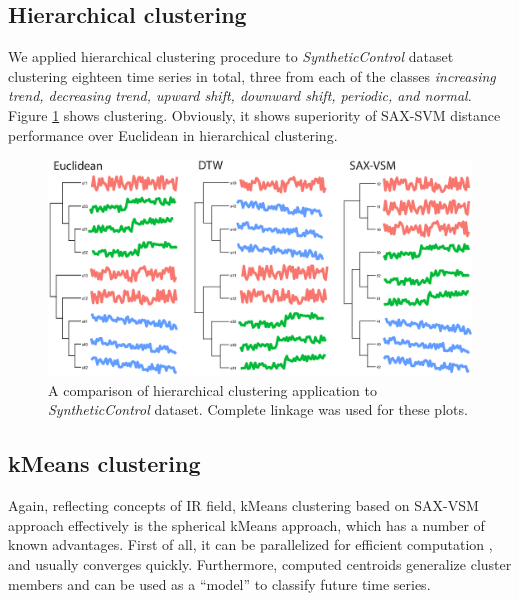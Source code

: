 \documentclass{llncs}
\begin{document}
\subsection{Hierarchical clustering}
We applied hierarchical clustering procedure to \textit{SyntheticControl} dataset clustering
eighteen time series in total, three from each of the classes \textit{increasing trend, decreasing
trend, upward shift, downward shift, periodic, and normal}. Figure \ref{fig:hc} shows
clustering. Obviously, it shows superiority of SAX-SVM distance performance over Euclidean in
hierarchical clustering.

\begin{figure}[t]
   \centering
   \includegraphics[width=115mm]{figures/clustering.eps}
   \caption{A comparison of hierarchical clustering application to \textit{SyntheticControl}
dataset. Complete linkage was used for these plots.
   }
   \label{fig:hc}
\end{figure}

\subsection{kMeans clustering}
Again, reflecting concepts of IR field, kMeans clustering based on SAX-VSM approach effectively
is the spherical kMeans approach, which has a number of known advantages. First of all, it can be
parallelized for efficient computation \cite{modha}, and usually converges quickly. Furthermore,
computed centroids generalize cluster members and can be used as a ``model'' to classify future 
time series.
\end{document}
